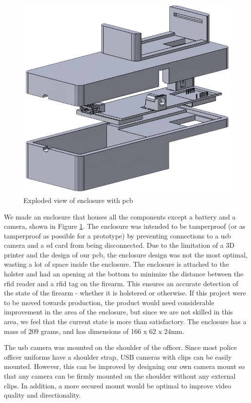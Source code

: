 \documentclass[12pt]{article}
\begin{document}
\begin{figure}[h]
    \centering
    \includegraphics[height=0.35\textheight]{exploded_enclosure}
    \caption{Exploded view of enclosure with \gls{pcb}}
    \label{fig:exploded_enclosure}
\end{figure}

We made an enclosure that houses all the components except a battery and a
camera, shown in Figure \ref{fig:exploded_enclosure}. The enclosure was
intended to be tamperproof (or as tamperproof as possible for a prototype) by
preventing connections to a \gls{usb} camera and a \gls{sd} card from being
disconnected.  Due to the limitation of a 3D printer and the design of our
\gls{pcb}, the enclosure design was not the most optimal, wasting a lot of
space inside the enclosure.  The enclosure is attached to the holster and had
an opening at the bottom to minimize the distance between the \gls{rfid} reader
and a \gls{rfid} tag on the firearm.  This ensures an accurate detection of the
state of the firearm - whether it is holstered or otherwise. If this project
were to be moved towards production, the product would need considerable
improvement in the area of the enclosure, but since we are not skilled in this
area, we feel that the current state is more than satisfactory. The enclosure
has a mass of 209 grams, and has dimensions of 166 x 62 x 24mm.

The \gls{usb} camera was mounted on the shoulder of the officer. Since most
police officer uniforms have a shoulder strap, USB cameras with clips can be
easily mounted. However, this can be improved by designing our own camera mount
so that any camera can be firmly mounted on the shoulder without any external
clips. In addition, a more secured mount would be optimal to improve video
quality and directionality.
\end{document}
